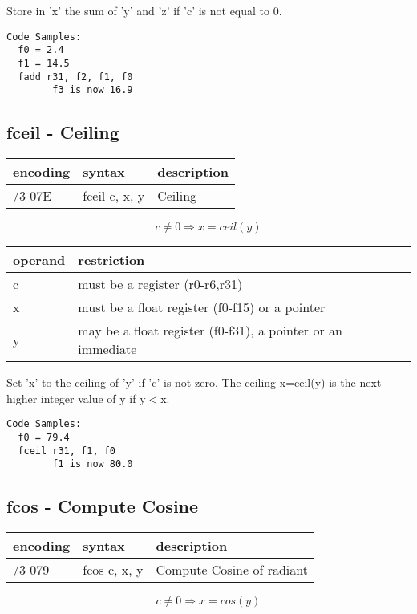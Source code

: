 \documentclass[letterpaper,10pt,openright,twoside,onecolumn]{book}
\begin{document}
  Store in 'x' the sum of 'y' and 'z' if 'c' is not equal to 0.

  \begin{verbatim}
Code Samples:
  f0 = 2.4
  f1 = 14.5
  fadd r31, f2, f1, f0
        f3 is now 16.9
  \end{verbatim}
\newpage\subsection{fceil - Ceiling}
  \begin{tabular}{|l|l|l|}
   \hline
    encoding & syntax & description \\
   \hline
    /3 07E & fceil c, x, y & Ceiling\\
   \hline
  \end{tabular}

  \begin{displaymath} c \neq 0 \Rightarrow x = ceil(y)\end{displaymath}

  \flushleft
  \begin{tabular}{|l|l|}
   \hline
    operand & restriction \\
   \hline
    c & must be a register (r0-r6,r31) \\
    x & must be a float register (f0-f15) or a pointer \\
    y & may be a float register (f0-f31), a pointer or an immediate \\
   \hline
  \end{tabular}

  Set 'x' to the ceiling of 'y' if 'c' is not zero. The ceiling x=ceil(y) is
  the next higher integer value of y if y$<$x.

  \begin{verbatim}
Code Samples:
  f0 = 79.4
  fceil r31, f1, f0
        f1 is now 80.0
  \end{verbatim}
  
\newpage\subsection{fcos - Compute Cosine}
  \begin{tabular}{|l|l|l|}
   \hline
    encoding & syntax & description \\
   \hline
    /3 079 & fcos c, x, y & Compute Cosine of radiant\\
   \hline
  \end{tabular}

  \begin{displaymath} c \neq 0 \Rightarrow x = cos(y)\end{displaymath}
\end{document}
